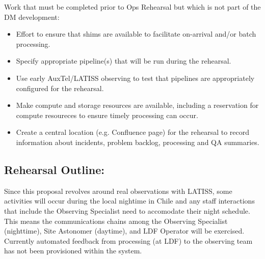 Work that must be completed prior to Ops Rehearsal but which is not part of 
the DM development:
\begin{itemize}[topsep=-8pt]
\item Effort to ensure that shims are available to facilitate on-arrival and/or
batch processing.  
\item Specify appropriate pipeline(s) that will be run during the rehearsal.
\item Use early AuxTel/LATISS observing to test that pipelines are appropriately 
configured for the rehearsal.
\item Make compute and storage resources are available, including a reservation for
compute resoureces to ensure timely processing can occur.
\item Create a central location (e.g. Confluence page) for the rehearsal to record 
information about incidents, problem backlog, processing and QA summaries.
\end{itemize}


\subsection{Rehearsal Outline:}
Since this proposal revolves around real observations with LATISS, some activities will
occur during the local nightime in Chile and any staff interactions that include
the Observing Specialist need to accomodate their night schedule.  This
means the communications chains among the Observing Specialist (nighttime), 
Site Astonomer (daytime), and LDF Operator will be exercised.  Currently automated
feedback from processing (at LDF) to the observing team has not been provisioned 
within the system.

